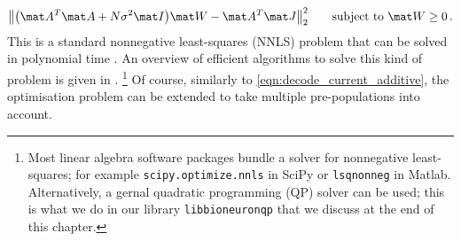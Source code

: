 \begin{align}
	\bigl\| \bigl( \mat A^T \mat A + N \sigma^2 \mat I \bigr) \mat W - \mat A^T \mat J \bigr\|_2^2 \quad\quad \text{subject to } \mat W \geq 0 \,.
	\label{eqn:decode_nonneg_canon}
\end{align}
This is a standard nonnegative least-squares (NNLS) problem that can be solved in polynomial time \citep[Chapter~23]{lawson1995solving}.
An overview of efficient algorithms to solve this kind of problem is given in \citet{chen2009nonnegativity}.%
\footnote{Most linear algebra software packages bundle a solver for nonnegative least-squares; for example \texttt{scipy.optimize.nnls} in SciPy or \texttt{lsqnonneg} in Matlab. Alternatively, a gernal quadratic programming (QP) solver can be used; this is what we do in our library \texttt{libbioneuronqp} that we discuss at the end of this chapter.}
Of course, similarly to \cref{eqn:decode_current_additive}, the optimisation problem can be extended to take multiple pre-populations into account.

